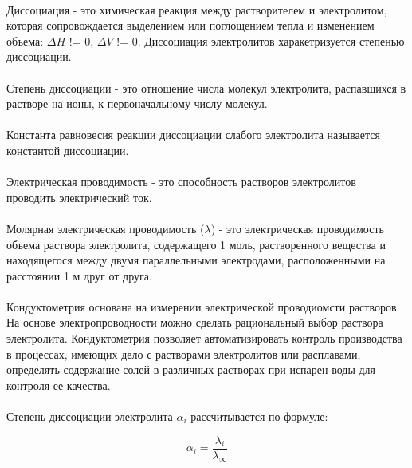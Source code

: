 \documentclass[a4paper,12pt]{article} %
\begin{document}
\paragraph{}
Диссоциация - это химическая реакция между растворителем и электролитом, которая сопровождается выделением или поглощением тепла и изменением объема: $\Delta{H}$ != 0, $\Delta{V}$ != 0. Диссоциация электролитов харакетризуется степенью диссоциации.
\paragraph{}
Степень диссоциации - это отношение числа молекул электролита, распавшихся в растворе на ионы, к первоначальному числу молекул.
\paragraph{}
Константа равновесия реакции диссоциации слабого электролита называется константой диссоциации.
\paragraph{}
Электрическая проводимость - это способность растворов электролитов проводить электрический ток.
\paragraph{}
Молярная электрическая проводимость ($\lambda$) - это электрическая проводимость объема раствора электролита, содержащего 1 моль, растворенного вещества и находящегося между двумя параллельными электродами, расположенными на расстоянии 1 м друг от друга.
\paragraph{}
Кондуктометрия основана на измерении электрической проводиомсти растворов. На основе электропроводности можно сделать рациональный выбор раствора электролита. Кондуктометрия позволяет автоматизировать контроль производства в процессах, имеющих дело с растворами электролитов или расплавами, определять содержание солей в различных растворах при испарен воды для контроля ее качества.
\paragraph{}
Степень диссоциации электролита $\alpha_{i}$ рассчитывается по формуле:

\begin{equation}
    \alpha_{i} = \frac{\lambda_{i}}{\lambda_{\infty}}
\end{equation}
\end{document}
